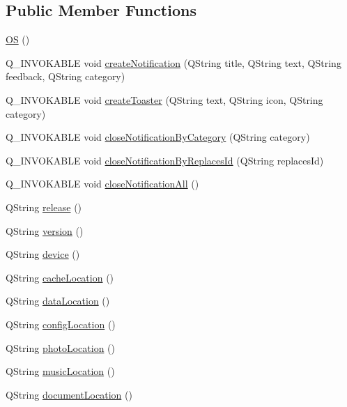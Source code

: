 \subsection*{Public Member Functions}
\begin{DoxyCompactItemize}
\item 
\mbox{\hyperlink{classOS_aee121bb510546f335b13791c7c7b4330}{OS}} ()
\item 
Q\+\_\+\+I\+N\+V\+O\+K\+A\+B\+LE void \mbox{\hyperlink{classOS_ac21113cbcd347809f657c6a27a0278f6}{create\+Notification}} (Q\+String title, Q\+String text, Q\+String feedback, Q\+String category)
\item 
Q\+\_\+\+I\+N\+V\+O\+K\+A\+B\+LE void \mbox{\hyperlink{classOS_a949a6aa1c2f8cd63d27cd6b8869da8fc}{create\+Toaster}} (Q\+String text, Q\+String icon, Q\+String category)
\item 
Q\+\_\+\+I\+N\+V\+O\+K\+A\+B\+LE void \mbox{\hyperlink{classOS_a8ab936784f48408f14ad73f10ae5afb8}{close\+Notification\+By\+Category}} (Q\+String category)
\item 
Q\+\_\+\+I\+N\+V\+O\+K\+A\+B\+LE void \mbox{\hyperlink{classOS_a8cc3c6824e01ae679819c8c3daf7842e}{close\+Notification\+By\+Replaces\+Id}} (Q\+String replaces\+Id)
\item 
Q\+\_\+\+I\+N\+V\+O\+K\+A\+B\+LE void \mbox{\hyperlink{classOS_a16c6da56d519e2c2bccbdeaf5c4ff29b}{close\+Notification\+All}} ()
\item 
Q\+String \mbox{\hyperlink{classOS_a1d00cd418f5d83cc174492326f7cd604}{release}} ()
\item 
Q\+String \mbox{\hyperlink{classOS_a4cd043becb244d8f40bdcc55c0417a71}{version}} ()
\item 
Q\+String \mbox{\hyperlink{classOS_a800e819bbb7aa20945893d138b2a1bb3}{device}} ()
\item 
Q\+String \mbox{\hyperlink{classOS_a44dcb6a2ee199b111d98eb1e364bfef7}{cache\+Location}} ()
\item 
Q\+String \mbox{\hyperlink{classOS_ae8a69330410d1b615443920baa19cea7}{data\+Location}} ()
\item 
Q\+String \mbox{\hyperlink{classOS_ae319d1766558e1a93f0d2736d7f898b2}{config\+Location}} ()
\item 
Q\+String \mbox{\hyperlink{classOS_afa7ce7d8541fbbd43d82f09f8662af44}{photo\+Location}} ()
\item 
Q\+String \mbox{\hyperlink{classOS_a611cc2d2496f6974b5087e8e2d3085e6}{music\+Location}} ()
\item 
Q\+String \mbox{\hyperlink{classOS_a88ba12fba1acd2557506942e0099634b}{document\+Location}} ()

\end{DoxyCompactItemize}
